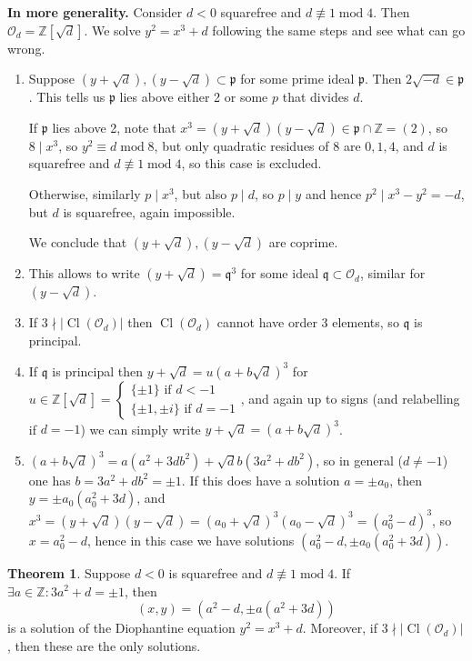 \documentclass{article}
\newcommand{\Z}{\mathbb{Z}}
\newcommand{\Mod}{\operatorname{mod}}
\newcommand{\Cl}{\operatorname{Cl}}
\newcommand{\ri}{\mathcal{O}}
\newcommand{\ip}{\mathfrak{p}}
\newcommand{\iq}{\mathfrak{q}}
\theoremstyle{definition}
\newtheorem{thm}[defn]{Theorem}
\begin{document}
\textbf{In more generality.} Consider $d<0$ squarefree and $d\nequiv 1\Mod 4$. Then $\ri_{d}=\Z\left[\sqrt d\right]$. We solve $y^2=x^3+d$ following the same steps and see what can go wrong.
\begin{enumerate}
\item Suppose $\left(y+\sqrt{d}\right),\left(y-\sqrt{d}\right)\subset\ip$ for some prime ideal $\ip$. Then $2\sqrt{-d}\in\ip$. This tells us $\ip$ lies above either 2 or some $p$ that divides $d$.

If $\ip$ lies above 2, note that $x^3=\left(y+\sqrt{d}\right)\left(y-\sqrt{d}\right)\in\ip\cap\Z=(2)$, so $8\mid x^3$, so $y^2\equiv d\Mod 8$, but only quadratic residues of 8 are $0,1,4$, and $d$ is squarefree and $d\nequiv 1\Mod 4$, so this case is excluded.

Otherwise, similarly $p\mid x^3$, but also $p\mid d$, so $p\mid y$ and hence $p^2\mid x^3-y^2=-d$, but $d$ is squarefree, again impossible.

We conclude that $\left(y+\sqrt{d}\right),\left(y-\sqrt{d}\right)$ are coprime.
\item This allows to write $\left(y+\sqrt{d}\right)=\iq^3$ for some ideal $\iq\subset\ri_d$, similar for $\left(y-\sqrt{d}\right)$.
\item If $3\nmid |\!\Cl(\ri_d)|$ then $\Cl(\ri_d)$ cannot have order 3 elements, so $\iq$ is principal.
\item If $\iq$ is principal then $y+\sqrt d=u\left(a+b\sqrt{d}\right)^3$ for $u\in\Z\left[\sqrt d\right]=\left\{ \begin{aligned}
\{\pm 1\}\text{ if }d< -1 \\ \{\pm 1,\pm i\}\text{ if }d=-1
\end{aligned} \right.$, and again up to signs (and relabelling if $d=-1$) we can simply write $y+\sqrt d=\left(a+b\sqrt{d}\right)^3$.
\item $\left(a+b\sqrt{d}\right)^3=a(a^2+3db^2)+\sqrt{d}b(3a^2+db^2)$, so in general ($d\neq -1$) one has $b=3a^2+db^2=\pm 1$. If this does have a solution $a=\pm a_0$, then $y=\pm a_0(a_0^2+3d)$, and $x^3=\left(y+\sqrt{d}\right)\left(y-\sqrt{d}\right)=\left(a_0+\sqrt{d}\right)^3\left(a_0-\sqrt{d}\right)^3=\left(a_0^2-d\right)^3$, so $x=a_0^2-d$, hence in this case we have solutions $\left(a_0^2-d,\pm a_0\left(a_0^2+3d\right)\right)$.
\end{enumerate}

\begin{thm}
Suppose $d<0$ is squarefree and $d\nequiv 1\Mod 4$. If $\exists a\in\Z:3a^2+d=\pm 1$, then
\[
(x,y)=\left(a^2-d,\pm a\left(a^2+3d\right)\right)
\]
is a solution of the Diophantine equation $y^2=x^3+d$. Moreover, if $3\nmid|\!\Cl(\ri_d)|$, then these are the only solutions.
\end{thm}
\end{document}
